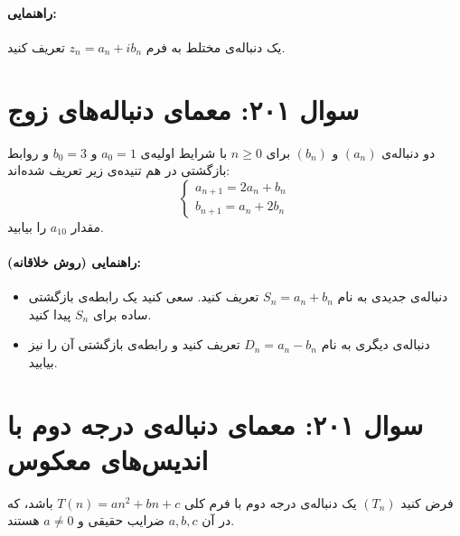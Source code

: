 \documentclass[12pt]{article}
\begin{document}
\paragraph{راهنمایی:}
یک دنباله‌ی مختلط به فرم \( z_n = a_n + i b_n \) تعریف کنید. 

\vspace{1cm}
\hrulefill
\vspace{1cm}

\section*{سوال ۲۰۱: معمای دنباله‌های زوج}
دو دنباله‌ی \( (a_n) \) و \( (b_n) \) برای \(n \ge 0\) با شرایط اولیه‌ی \(a_0 = 1\) و \(b_0 = 3\) و روابط بازگشتی در هم تنیده‌ی زیر تعریف شده‌اند:
\[ \begin{cases}
	a_{n+1} = 2a_n + b_n \\
	b_{n+1} = a_n + 2b_n
\end{cases} \]
مقدار \(a_{10}\) را بیابید.


\paragraph{راهنمایی (روش خلاقانه):}
\begin{itemize}[rightmargin=2cm]
	\item دنباله‌ی جدیدی به نام \(S_n = a_n + b_n\) تعریف کنید. سعی کنید یک رابطه‌ی بازگشتی ساده برای \(S_n\) پیدا کنید.
	\item دنباله‌ی دیگری به نام \(D_n = a_n - b_n\) تعریف کنید و رابطه‌ی بازگشتی آن را نیز بیابید.
	
\end{itemize}

\vspace{1cm}
\hrulefill
\vspace{1cm}

\section*{سوال ۲۰۱: معمای دنباله‌ی درجه دوم با اندیس‌های معکوس}
فرض کنید $(T_n)$ یک دنباله‌ی درجه دوم با فرم کلی $ T(n) = an^2 + bn + c $ باشد، که در آن $a, b, c$ ضرایب حقیقی و $a \neq 0$ هستند.
\vspace{0.5cm}
\end{document}

